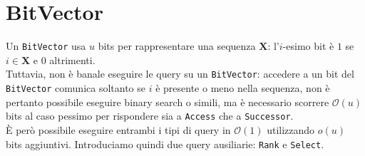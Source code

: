 \documentclass{article}
\newcommand{\X}{\mathbf{X}}
\newcommand{\ttt}{\texttt}
\newcommand*{\OO}{\ensuremath{\mathcal{O}}}
\begin{document}
\section{BitVector}

Un \ttt{BitVector} usa $u$ bits per rappresentare una sequenza $\X$: l'$i$-esimo bit \`e $1$ se $i \in \X$ e $0$ altrimenti. \\
Tuttavia, non \`e banale eseguire le query su un \ttt{BitVector}: accedere a un bit del \ttt{BitVector} comunica soltanto se $i$ \`e presente o meno nella sequenza, non \`e pertanto possibile eseguire binary search o simili, ma \`e necessario scorrere $\OO(u)$ bits al caso pessimo per rispondere sia a \ttt{Access} che a \ttt{Successor}.\\
\`E per\`o possibile eseguire entrambi i tipi di query in $\OO(1)$ utilizzando $o(u)$ bits aggiuntivi.\cite{10.5555/915547} \cite{10.1007/978-3-540-68552-4_12} Introduciamo quindi due query ausiliarie: \ttt{Rank} e \ttt{Select}.
\end{document}
